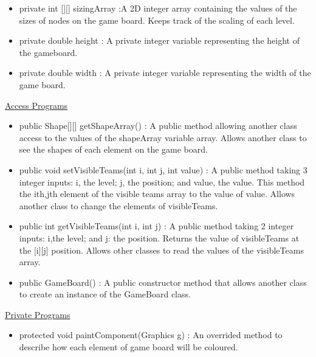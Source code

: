 \documentclass[12pt]{article}
\begin{document}
\begin{itemize}
\begin{itemize}
			\item private int [][] sizingArray :A 2D integer array containing the values of the sizes of nodes on the game board. Keeps track of the scaling of each level.
			\item private double height : A private integer variable representing the height of the gameboard.
			\item private double width : A private integer variable representing the width of the game board.
		\end{itemize}
		\underline{Access Programs}
		\begin{itemize}
			\item public Shape[][] getShapeArray() : A public method allowing another class access to the values of the shapeArray variable array. Allows another class to see the shapes of each element on the game board.
			\item public void setVisibleTeams(int i, int j, int value) : A public method taking 3 integer inputs: i, the level; j, the position; and value, the value. This method the ith,jth element of the visible teams array to the value of value. Allows another class to change the elements of visibleTeams.
			\item public int getVisibleTeams(int i, int j) : A public method taking 2 integer inputs: i,the level; and j: the position. Returns the value of visibleTeams at the [i][j] position. Allows other classes to read the values of the visibleTeams array.
			\item public GameBoard() : A public constructor method that allows another class to create an instance of the GameBoard class.
			
		\end{itemize}
		\underline{Private Programs}
		\begin{itemize}
			\item protected void paintComponent(Graphics g) : An overrided method to describe how each element of game board will be coloured. 
	
		\end{itemize}
		

\end{itemize}
\end{document}
